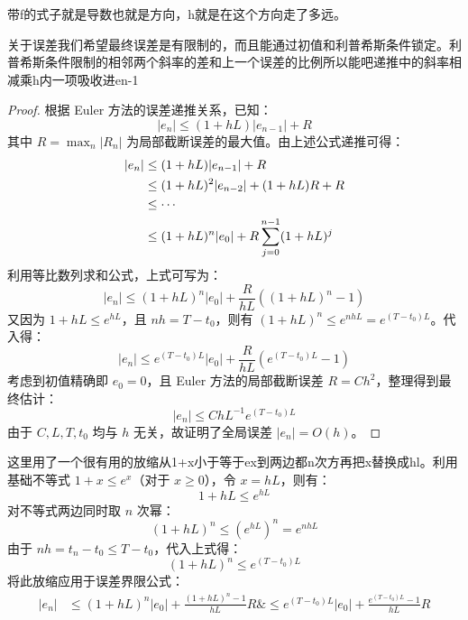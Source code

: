 \begin{dxtips}
带f的式子就是导数也就是方向，h就是在这个方向走了多远。
\end{dxtips}
关于误差我们希望最终误差是有限制的，而且能通过初值和利普希斯条件锁定。利普希斯条件限制的相邻两个斜率的差和上一个误差的比例所以能吧递推中的斜率相减乘h内一项吸收进en-1
\begin{proof}
根据 Euler 方法的误差递推关系，已知：
\begin{equation}
|e_n| \le (1 + hL)|e_{n-1}| + R
\end{equation}
其中 $R = \max_n |R_n|$ 为局部截断误差的最大值。由上述公式递推可得：
\begin{align}
|e_n| &\le (1 + hL)|e_{n-1}| + R \notag \\
&\le (1 + hL)^2 |e_{n-2}| + (1 + hL)R + R \notag \\
&\le \cdots \notag \\
&\le (1 + hL)^n |e_0| + R \sum_{j=0}^{n-1} (1 + hL)^j
\end{align}
利用等比数列求和公式，上式可写为：
\begin{equation}
|e_n| \le (1 + hL)^n |e_0| + \frac{R}{hL} \left( (1 + hL)^n - 1 \right)
\end{equation}
又因为 $1 + hL \le e^{hL}$，且 $nh = T - t_0$，则有 $(1 + hL)^n \le e^{nhL} = e^{(T - t_0)L}$。代入得：
\begin{equation}
|e_n| \le e^{(T - t_0)L} |e_0| + \frac{R}{hL} \left( e^{(T - t_0)L} - 1 \right)
\end{equation}
考虑到初值精确即 $e_0 = 0$，且 Euler 方法的局部截断误差 $R = Ch^2$，整理得到最终估计：
\begin{equation}
|e_n| \le ChL^{-1} e^{(T - t_0)L}
\end{equation}
由于 $C, L, T, t_0$ 均与 $h$ 无关，故证明了全局误差 $|e_n| = O(h)$。
\end{proof}
\begin{dxtips}
    这里用了一个很有用的放缩从1+x小于等于ex到两边都n次方再把x替换成hl。利用基础不等式 $1+x \le e^x$（对于 $x \ge 0$），令 $x = hL$，则有：\begin{equation}1 + hL \le e^{hL}\end{equation}对不等式两边同时取 $n$ 次幂：\begin{equation}(1 + hL)^n \le (e^{hL})^n = e^{nhL}\end{equation}由于 $nh = t_n - t_0 \le T - t_0$，代入上式得：\begin{equation}(1 + hL)^n \le e^{(T - t_0)L}\end{equation}将此放缩应用于误差界限公式：\begin{align}|e_n| &\le (1 + hL)^n |e_0| + \frac{(1 + hL)^n - 1}{hL} R \&\le e^{(T - t_0)L} |e_0| + \frac{e^{(T - t_0)L} - 1}{hL} R\end{align}
\end{dxtips}
